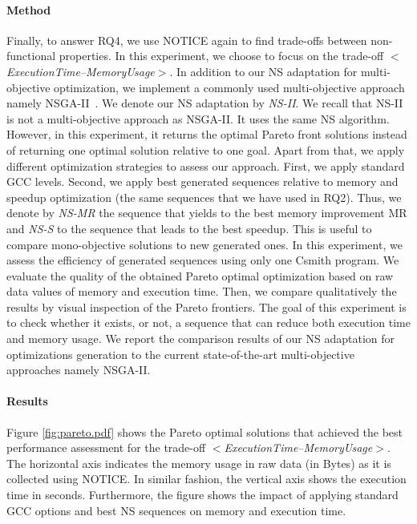 \paragraph{Method}
Finally, to answer RQ4, we use NOTICE again to find trade-offs between non-functional properties. 
In this experiment, we choose to focus on the trade-off \textit{$<$ExecutionTime--MemoryUsage$>$}. In addition to our NS adaptation for multi-objective optimization, we implement a commonly used multi-objective approach namely NSGA-II~\cite{deb2002fast}. 
We denote our NS adaptation by \textit{NS-II}. We recall that NS-II is not a multi-objective approach as NSGA-II. It uses the same NS algorithm. However, in this experiment, it returns the optimal Pareto front solutions instead of returning one optimal solution relative to one goal. 
Apart from that, we apply different optimization strategies to assess our approach. 	
First, we apply standard GCC levels. Second, we apply best generated sequences relative to memory and speedup optimization (the same sequences that we have used in RQ2). Thus, we denote by \textit{NS-MR} the sequence that yields to the best memory improvement MR and \textit{NS-S} to the sequence that leads to the best speedup. This is useful to compare mono-objective solutions to new generated ones.
In this experiment, we assess the efficiency of generated sequences using only one Csmith program.
We evaluate the quality of the obtained Pareto optimal optimization based on raw data values of memory and execution time. Then, we compare qualitatively the results by visual inspection of the Pareto frontiers.
The goal of this experiment is to check whether it exists, or not, a sequence that can reduce both execution time and memory usage.
We report the comparison results of our NS adaptation for optimizations generation to the current state-of-the-art multi-objective approaches namely NSGA-II. 

\paragraph{Results}

Figure \ref{fig:pareto.pdf} shows the Pareto optimal solutions that achieved the best performance assessment for the trade-off \textit{$<$ExecutionTime--MemoryUsage$>$}. 
The horizontal axis indicates the memory usage in raw data (in Bytes) as it is collected using NOTICE. In similar fashion, the vertical axis shows the execution time in seconds. Furthermore, the figure shows the impact of applying standard GCC options and best NS sequences on memory and execution time. 


